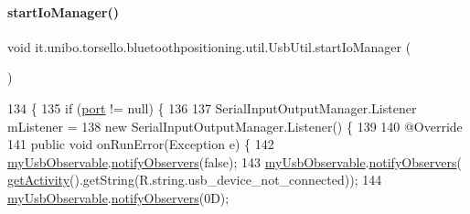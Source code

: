 \paragraph{\texorpdfstring{start\+Io\+Manager()}{startIoManager()}}
{\footnotesize\ttfamily void it.\+unibo.\+torsello.\+bluetoothpositioning.\+util.\+Usb\+Util.\+start\+Io\+Manager (\begin{DoxyParamCaption}{ }\end{DoxyParamCaption})\hspace{0.3cm}{\ttfamily [private]}}


\begin{DoxyCode}
134                                   \{
135         \textcolor{keywordflow}{if} (\hyperlink{classit_1_1unibo_1_1torsello_1_1bluetoothpositioning_1_1util_1_1UsbUtil_a49aef08510b6d48d627670d834099c36_a49aef08510b6d48d627670d834099c36}{port} != null) \{
136 
137             SerialInputOutputManager.Listener mListener =
138                     \textcolor{keyword}{new} SerialInputOutputManager.Listener() \{
139 
140                         @Override
141                         \textcolor{keyword}{public} \textcolor{keywordtype}{void} onRunError(Exception e) \{
142                             \hyperlink{classit_1_1unibo_1_1torsello_1_1bluetoothpositioning_1_1util_1_1UsbUtil_a1c500d0f1a3f3a11b16015acc49929e0_a1c500d0f1a3f3a11b16015acc49929e0}{myUsbObservable}.\hyperlink{classit_1_1unibo_1_1torsello_1_1bluetoothpositioning_1_1observables_1_1UsbMeasurementObservable_abcb4f86ee4b212c3dbc0a814e989ab73_abcb4f86ee4b212c3dbc0a814e989ab73}{notifyObservers}(\textcolor{keyword}{false});
143                             \hyperlink{classit_1_1unibo_1_1torsello_1_1bluetoothpositioning_1_1util_1_1UsbUtil_a1c500d0f1a3f3a11b16015acc49929e0_a1c500d0f1a3f3a11b16015acc49929e0}{myUsbObservable}.\hyperlink{classit_1_1unibo_1_1torsello_1_1bluetoothpositioning_1_1observables_1_1UsbMeasurementObservable_abcb4f86ee4b212c3dbc0a814e989ab73_abcb4f86ee4b212c3dbc0a814e989ab73}{notifyObservers}(
      \hyperlink{classit_1_1unibo_1_1torsello_1_1bluetoothpositioning_1_1util_1_1UsbUtil_a625b1885830a4d2c359a534834a46648_a625b1885830a4d2c359a534834a46648}{getActivity}().getString(R.string.usb\_device\_not\_connected));
144                             \hyperlink{classit_1_1unibo_1_1torsello_1_1bluetoothpositioning_1_1util_1_1UsbUtil_a1c500d0f1a3f3a11b16015acc49929e0_a1c500d0f1a3f3a11b16015acc49929e0}{myUsbObservable}.\hyperlink{classit_1_1unibo_1_1torsello_1_1bluetoothpositioning_1_1observables_1_1UsbMeasurementObservable_abcb4f86ee4b212c3dbc0a814e989ab73_abcb4f86ee4b212c3dbc0a814e989ab73}{notifyObservers}(0D);

\end{DoxyCode}
